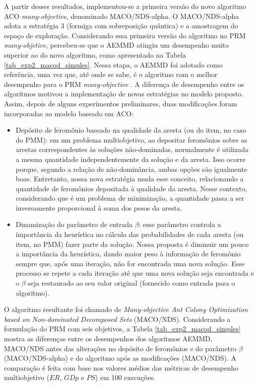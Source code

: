 A partir desses resultados, implementou-se a primeira versão do novo algoritmo ACO \textit{many-objective}, denominado MACO/NDS-alpha. O MACO/NDS-alpha adota a estratégia 3 (formiga com sobreposição quântica) e a amostragem do espaço de exploração. Considerando essa primeira versão do algoritmo no PRM \textit{many-objetive}, percebeu-se que o AEMMD atingiu um desempenho muito superior ao do novo algoritmo, como apresentado na Tabela \ref{tab_exp2_macod_simples}. Nessa etapa, o AEMMD foi adotado como referência, uma vez que, até onde se sabe, é o algoritmo com o melhor desempenho para o PRM \textit{many-objective} \cite{LafetaThesis}. A diferença de desempenho entre os algoritmos motivou a implementação de novas estratégias no modelo proposto. Assim, depois de alguns experimentos preliminares, duas modificações foram incorporadas ao modelo baseado em ACO:

\begin{itemize}
	\item Depósito de feromônio baseado na qualidade da aresta (ou do item, no caso do PMM): em um problema multiobjetivo, ao depositar feromônios sobre as arestas correspondentes às soluções não-dominadas, normalmente é utilizada a mesma quantidade independentemente da solução e da aresta. Isso ocorre porque, segundo a relação de não-dominância, ambas opções são igualmente boas. Entretanto, nossa nova estratégia muda esse conceito, relacionando a quantidade de feromônios depositada à qualidade da aresta. Nesse contexto, considerando que é um problema de minimização, a quantidade passa a ser inversamente proporcional à soma dos pesos da aresta.
	\item Dinamização do parâmetro de entrada $\beta$: esse parâmetro controla a importância da heurística no cálculo das probabilidades de cada aresta (ou item, no PMM) fazer parte da solução. Nossa proposta é diminuir um pouco a importância da heurística, dando maior peso à informação de feromônio sempre que, após uma iteração, não for encontrada uma nova solução. Esse processo se repete a cada iteração até que uma nova solução seja encontrada e o $\beta$ seja restaurado ao seu valor original (fornecido como entrada para o algoritmo).
\end{itemize}

O algoritmo resultante foi chamado de \textit{Many-objective Ant Colony Optimization based on Non-dominated Decomposed Sets} (MACO/NDS). Considerando a formulação do PRM com seis objetivos, a Tabela \ref{tab_exp2_macod_simples} mostra as diferenças entre os desempenhos dos algoritmos AEMMD, MACO/NDS antes das alterações no depósito de feromônios e do parâmetro $\beta$ (MACO/NDS-alpha) e do algoritmo após as modificações (MACO/NDS). A comparação é feita com base nos valores médios das métricas de desempenho multiobjetivo ($ER$, $GDp$ e $PS$) em 100 execuções.

